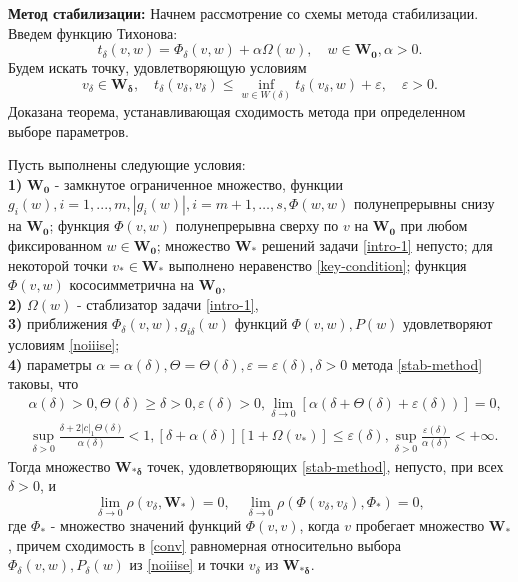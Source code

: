 \textbf{Метод стабилизации:} Начнем рассмотрение со схемы метода стабилизации. Введем функцию Тихонова: 
\begin{equation}
t_{\delta} (v,w)=\Phi_{\delta}(v,w)+\alpha \Omega(w),\quad w\in \mathbf{W_0},\alpha>0.
\end{equation}
Будем искать точку, удовлетворяющую условиям
\begin{equation}
\label{stab-method}
v_{\delta}\in \mathbf{W_{\delta}},\quad t_{\delta}(v_\delta,v_\delta)\leqslant \inf\limits_{w\in W(\delta)}t_{\delta}(v_{\delta},w)+\varepsilon,\quad \varepsilon>0.
\end{equation}
Доказана теорема\cite{11}, устанавливающая сходимость метода при определенном выборе параметров.
\begin{theo}
\label{theo-stab}
Пусть выполнены следующие условия:\\
\textbf{1)} $\mathbf{W_0}$ - замкнутое ограниченное множество, функции $g_i(w),i=1,...,m,|g_i(w)|,i=m+1,\ldots,s,\Phi(w,w)$ полунепрерывны снизу на $\mathbf{W_0}$; функция $\Phi(v,w)$ полунепрерывна сверху по $v$ на $\mathbf{W_0}$ при любом фиксированном $w\in\mathbf{W_0}$; множество $\mathbf{W_*}$ решений задачи \eqref{intro-1} непусто; для некоторой точки $v_*\in\mathbf{W_*}$ выполнено неравенство \eqref{key-condition}; функция $\Phi(v,w)$ кососимметрична на $\mathbf{W_0}$,\\
\textbf{2)} $\Omega(w)$ - стаблизатор задачи \eqref{intro-1},\\
\textbf{3)} приближения $\Phi_{\delta}(v,w),g_{i\delta}(w)$ функций $\Phi(v,w),P(w)$ удовлетворяют условиям \eqref{noiiise};\\
\textbf{4)} параметры $\alpha=\alpha(\delta),\Theta=\Theta(\delta),\varepsilon=\varepsilon(\delta),\delta>0$ метода \eqref{stab-method} таковы, что
\begin{equation}
\begin{aligned}
&\alpha(\delta)>0,\Theta(\delta)\geqslant \delta>0,\varepsilon(\delta)>0,\lim_{\delta\rightarrow 0} [\alpha(\delta+\Theta(\delta)+\varepsilon(\delta))]=0,\\
&\sup_{\delta>0}\frac{\delta+2|c|_1\Theta(\delta)}{\alpha(\delta)}<1,[\delta+\alpha(\delta)][1+\Omega(v_*)]\leqslant \varepsilon(\delta), \sup_{\delta>0}\frac{\varepsilon(\delta)}{\alpha(\delta)}<+\infty.
\end{aligned}
\end{equation}
Тогда множество $\mathbf{W_{*\delta}}$ точек, удовлетворяющих \eqref{stab-method}, непусто, при всех $\delta>0$, и 
\begin{equation}
\label{conv}
\lim_{\delta\rightarrow 0}\rho(v_{\delta},\mathbf{W_*})=0,\quad\lim_{\delta\rightarrow 0} \rho(\Phi(v_{\delta},v_{\delta}),\Phi_*)=0,
\end{equation}
где $\Phi_*$ - множество значений функций $\Phi(v,v)$, когда $v$ пробегает множество $\mathbf{W_*}$, причем сходимость в \eqref{conv} равномерная относительно выбора $\Phi_{\delta}(v,w),P_{\delta}(w)$ из \eqref{noiiise} и точки $v_{\delta}$ из $\mathbf{W_{*\delta}}$.
\end{theo}

